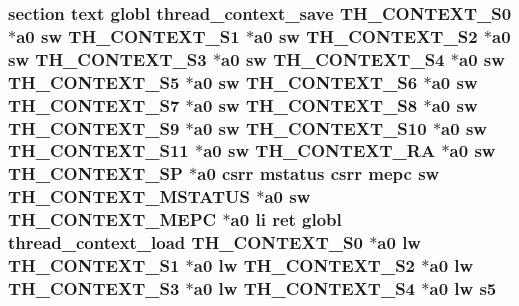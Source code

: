 \hypertarget{riscv_2kpanica_8S_a432c13dedb663e3f553549e4ed37cd91}{
\subsubsection[{s5}]{\setlength{\rightskip}{0pt plus 5cm}section text globl {\bf thread\-\_\-context\-\_\-save} {\bf T\-H\-\_\-\-C\-O\-N\-T\-E\-X\-T\-\_\-\-S0} $\ast${\bf a0} {\bf sw} {\bf T\-H\-\_\-\-C\-O\-N\-T\-E\-X\-T\-\_\-\-S1} $\ast${\bf a0} {\bf sw} {\bf T\-H\-\_\-\-C\-O\-N\-T\-E\-X\-T\-\_\-\-S2} $\ast${\bf a0} {\bf sw} {\bf T\-H\-\_\-\-C\-O\-N\-T\-E\-X\-T\-\_\-\-S3} $\ast${\bf a0} {\bf sw} {\bf T\-H\-\_\-\-C\-O\-N\-T\-E\-X\-T\-\_\-\-S4} $\ast${\bf a0} {\bf sw} {\bf T\-H\-\_\-\-C\-O\-N\-T\-E\-X\-T\-\_\-\-S5} $\ast${\bf a0} {\bf sw} {\bf T\-H\-\_\-\-C\-O\-N\-T\-E\-X\-T\-\_\-\-S6} $\ast${\bf a0} {\bf sw} {\bf T\-H\-\_\-\-C\-O\-N\-T\-E\-X\-T\-\_\-\-S7} $\ast${\bf a0} {\bf sw} {\bf T\-H\-\_\-\-C\-O\-N\-T\-E\-X\-T\-\_\-\-S8} $\ast${\bf a0} {\bf sw} {\bf T\-H\-\_\-\-C\-O\-N\-T\-E\-X\-T\-\_\-\-S9} $\ast${\bf a0} {\bf sw} {\bf T\-H\-\_\-\-C\-O\-N\-T\-E\-X\-T\-\_\-\-S10} $\ast${\bf a0} {\bf sw} {\bf T\-H\-\_\-\-C\-O\-N\-T\-E\-X\-T\-\_\-\-S11} $\ast${\bf a0} {\bf sw} {\bf T\-H\-\_\-\-C\-O\-N\-T\-E\-X\-T\-\_\-\-R\-A} $\ast${\bf a0} {\bf sw} {\bf T\-H\-\_\-\-C\-O\-N\-T\-E\-X\-T\-\_\-\-S\-P} $\ast${\bf a0} csrr {\bf mstatus} csrr {\bf mepc} {\bf sw} {\bf T\-H\-\_\-\-C\-O\-N\-T\-E\-X\-T\-\_\-\-M\-S\-T\-A\-T\-U\-S} $\ast${\bf a0} {\bf sw} {\bf T\-H\-\_\-\-C\-O\-N\-T\-E\-X\-T\-\_\-\-M\-E\-P\-C} $\ast${\bf a0} {\bf li} ret globl {\bf thread\-\_\-context\-\_\-load} {\bf T\-H\-\_\-\-C\-O\-N\-T\-E\-X\-T\-\_\-\-S0} $\ast${\bf a0} {\bf lw} {\bf T\-H\-\_\-\-C\-O\-N\-T\-E\-X\-T\-\_\-\-S1} $\ast${\bf a0} {\bf lw} {\bf T\-H\-\_\-\-C\-O\-N\-T\-E\-X\-T\-\_\-\-S2} $\ast${\bf a0} {\bf lw} {\bf T\-H\-\_\-\-C\-O\-N\-T\-E\-X\-T\-\_\-\-S3} $\ast${\bf a0} {\bf lw} {\bf T\-H\-\_\-\-C\-O\-N\-T\-E\-X\-T\-\_\-\-S4} $\ast${\bf a0} {\bf lw} s5}}\label{riscv_2kpanica_8S_a432c13dedb663e3f553549e4ed37cd91}
